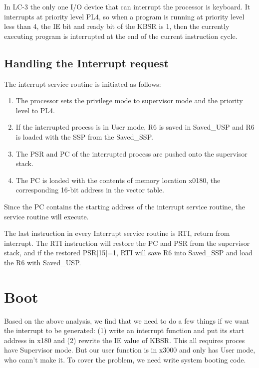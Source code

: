 \documentclass[20pt]{ctexart}
\begin{document}
In LC-3 the only one I/O device that can interrupt the processor is keyboard. It interrupts at priority level PL4, so when a program is running at priority level less than 4, the IE bit and ready bit of the KBSR is 1, then the currently executing program is interrupted at the end of the current instruction cycle.

\subsection{Handling the Interrupt request}
The interrupt service routine is initiated as follows:
\begin{enumerate}[itemindent=2em]
        \setlength{\itemsep}{-5pt}
        \item The processor sets the privilege mode to supervisor mode and the priority level to PL4.
        \item If the interrupted process is in User mode, R6 is saved in Saved\_USP and R6 is loaded with the SSP from the Saved\_SSP.
        \item The PSR and PC of the interrupted process are pushed onto the supervisor stack.
        \item The PC is loaded with the contents of memory location x0180, the corresponding 16-bit address in the vector table.
      \end{enumerate}

Since the PC contains the starting address of the interrupt service routine, the service routine will execute.

The last instruction in every Interrupt service routine is RTI, return from interrupt. The RTI instruction will restore the PC and PSR from the supervisor stack, and if the restored PSR[15]=1, RTI will save R6 into Saved\_SSP and load the R6 with Saved\_USP. 

\section{Boot}
Based on the above analysis, we find that we need to do a few things if we want the interrupt to be generated: (1) write an interrupt function and put its start address in x180 and (2) rewrite the IE value of KBSR. This all requires proces have Supervisor mode. But our user function is in x3000 and only has User mode, who cann't make it. To cover the problem, we need write system booting code. 
\end{document}
